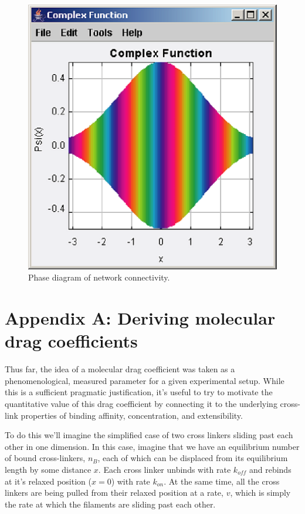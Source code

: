 \documentclass[prb,11pt]{revtex4-1}
\begin{document}
\begin{figure}[h!]
\centering
\includegraphics[scale=0.6]{phase}
\caption{\label{fig:sim}Phase diagram of network connectivity.}
\end{figure}

\section{Appendix A: Deriving molecular drag coefficients}
Thus far, the idea of a molecular drag coefficient was taken as a phenomenological, measured parameter for a given experimental setup.  While this is a sufficient pragmatic justification, it's useful to try to motivate the quantitative value of this drag coefficient by connecting it to the underlying cross-link properties of binding affinity, concentration, and extensibility.

To do this we'll imagine the simplified case of two cross linkers sliding past each other in one dimension.  In this case, imagine that we have an equilibrium number of bound cross-linkers, $n_B$, each of which can be displaced from its equilibrium length by some distance $x$.  Each cross linker unbinds with rate $k_{off}$ and rebinds at it's relaxed position ($x=0$) with rate $k_{on}$.  At the same time, all the cross linkers are being pulled from their relaxed position at a rate, $v$, which is simply the rate at which the filaments are sliding past each other.  
\end{document}
